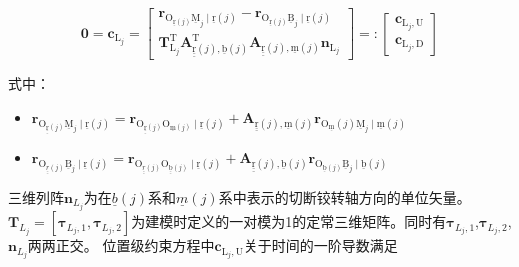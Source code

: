 \[
\mathbf{0}=\boldsymbol{c}_{\mathrm{L}_{j}}=\left[\begin{array}{l}\boldsymbol{r}_{\mathrm{O}_{\underline{\mathrm{r}}(j)} \underline{\mathrm{M}}_{j} \mid \underline{\mathrm{r}}(j)}-\boldsymbol{r}_{\mathrm{O}_{\underline{\mathrm{r}}(j)} \underline{\mathrm{B}}_{j} \mid \underline{\mathrm{r}}(j)} \\
\boldsymbol{T}_{\mathrm{L}_{j}}^{\mathrm{T}} \boldsymbol{A}_{\underline{\underline{\mathrm{r}}}(j), \underline{\mathrm{b}}(j)}^{\mathrm{T}} \boldsymbol{A}_{\underline{\underline{\mathrm{r}}}(j), \underline{\mathrm{m}}(j)} \boldsymbol{n}_{\mathrm{L}_{j}}
\end{array}\right]=:\left[\begin{array}{l}
\boldsymbol{c}_{\mathrm{L}_{j}, \mathrm{U}} \\
\boldsymbol{c}_{\mathrm{L}_{j}, \mathrm{D}}
\end{array}\right]
\]

式中：

\begin{itemize}

\item $\boldsymbol{r}_{\mathrm{O}_{\underline{\underline{\mathrm{r}}}(j)} \underline{\mathrm{M}}_{j} \mid \underline{\mathrm{r}}(j)}=\boldsymbol{r}_{\mathrm{O}_{\underline{\underline{\mathrm{r}}}(j)} \mathrm{O}_{\underline{\mathrm{m}}(j)} \mid \underline{\mathrm{r}}(j)}+\boldsymbol{A}_{\underline{\underline{\mathrm{r}}}(j), \underline{\mathrm{m}}(j)} \boldsymbol{r}_{\mathrm{O}_{\underline{\mathrm{m}}}(j) \underline{\mathrm{M}}_{j} \mid \underline{\mathrm{m}}(j)}$

\item $\boldsymbol{r}_{\mathrm{O}_{\underline{\underline{r}}(j)} \underline{\mathrm{B}}_{j} \mid \underline{\mathrm{r}}(j)}=\boldsymbol{r}_{\mathrm{O}_{\underline{\underline{r}}(j)} \mathrm{O}_{\underline{\underline{\mathrm{b}}}(j)} \mid \underline{\mathrm{r}}(j)}+\boldsymbol{A}_{\underline{\underline{\mathrm{r}}}(j), \underline{\mathrm{b}}(j)} \boldsymbol{r}_{\mathrm{O}_{\underline{\mathrm{b}}(j)} \underline{\mathrm{B}}_{j} \mid \underline{\mathrm{b}}(j)}$

\end{itemize}
三维列阵$\boldsymbol{n}_{L_{j}}$为在$\underline{b}(j)$系和$\underline{m}(j)$系中表示的切断铰转轴方向的单位矢量。
$\boldsymbol{T}_{L_{j}}=[\boldsymbol{\tau}_{L_{j},1},\boldsymbol{\tau}_{L_{j},2}]$为建模时定义的一对模为1的定常三维矩阵。同时有$\boldsymbol{\tau}_{L_{j},1}$,$\boldsymbol{\tau}_{L_{j},2}$,$\boldsymbol{n}_{L_{j}}$两两正交。 位置级约束方程中$\boldsymbol{c}_{\mathrm{L}_{j}, \mathrm{U}}$关于时间的一阶导数满足

